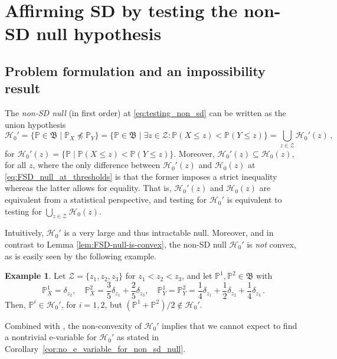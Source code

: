 \documentclass[12pt,twoside]{article}
\theoremstyle{plain}
\theoremstyle{definition}
\newtheorem{example}{Example}
\theoremstyle{remark}
\newcommand{\calH}{\mathcal{H}}
\newcommand{\calZ}{\mathcal{Z}}
\newcommand{\Psymb}{\mathbb{P}}
\newcommand{\frakB}{\mathfrak{B}}
\newcommand{\notsd}{\npreceq}
\begin{document}
\section{Affirming SD by testing the non-SD null hypothesis}\label{app:testing_non_SD_null}

\subsection{Problem formulation and an impossibility result}\label{sec:impossibility_non_sd_null}

The \emph{non-SD null} (in first order) at \eqref{eq:testing_non_sd} can be written as the union hypothesis
\begin{equation*}\label{eq:def_non_sd_null}
    \calH_0' = \{\Psymb \in \frakB \mid \Psymb_X \notsd \Psymb_Y \} =\{\Psymb \in \frakB \mid \exists z \in \calZ: \Psymb(X \leq z) < \Psymb(Y \leq z)\}=\bigcup_{z\in \calZ}  \calH_0'(z)\,,
\end{equation*}
for $\calH_0'(z) = \{\Psymb \mid \Psymb(X \leq z) < \Psymb(Y \leq z) \}$.
Moreover, $\calH_0'(z) \subseteq \calH_0(z)$, for all $z$, where the only difference between $\calH_0'(z)$ and $\calH_0(z)$ at \eqref{eq:FSD_null_at_thresholds} is that the former imposes a strict inequality whereas the latter allows for equality. That is, $\calH_0'(z)$ and $\calH_0(z)$ are equivalent from a statistical perspective, and testing for $\calH_0'$ is equivalent to testing for $\bigcup_{z\in \calZ} \calH_0(z)$. 

Intuitively, $\calH_0'$ is a very large and thus intractable null. 
Moreover, and in contrast to Lemma \ref{lem:FSD-null-is-convex}, the non-SD null $\calH_0'$ is \emph{not} convex, as is easily seen by the following example. 
\begin{example}
    Let $\calZ= \{z_1,z_2,z_3\}$ for $z_1<z_2<z_3$, and let $\Psymb^1,\Psymb^2 \in \frakB$ with
    \begin{equation*}
        \Psymb^1_X = \delta_{z_2}, \quad  \Psymb^2_X = \frac{3}{5}\delta_{z_1}+\frac{2}{5}\delta_{z_3}, \quad  \Psymb^1_Y= \Psymb^2_Y= \frac{1}{4}\delta_{z_1}+\frac{1}{2}\delta_{z_2}+\frac{1}{4}\delta_{z_3}\,.
    \end{equation*}
    Then, $\Psymb^i \in \calH_0'$, for $i=1,2$, but $(\Psymb^1+\Psymb^2)/2\notin \calH_0'$.
\end{example}
Combined with \citet[][Theorem 6.2]{zhang2024existence}, the non-convexity of $\calH_0'$ implies that we cannot expect to find a nontrivial e-variable for $\calH_0'$ as stated in Corollary~\ref{cor:no_e_variable_for_non_sd_null}. 
\end{document}
